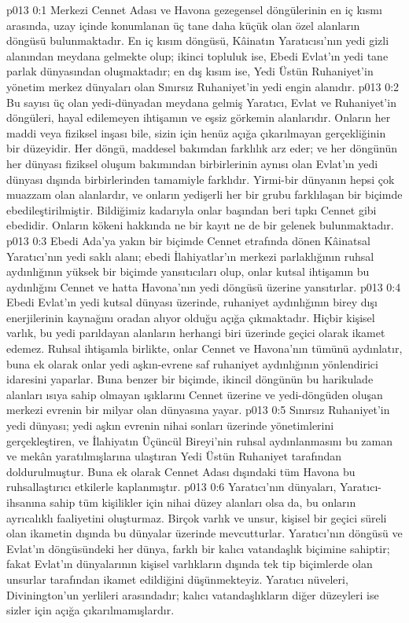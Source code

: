\vs p013 0:1 Merkezi Cennet Adası ve Havona gezegensel döngülerinin en iç kısmı arasında, uzay içinde konumlanan üç tane daha küçük olan özel alanların döngüsü bulunmaktadır. En iç kısım döngüsü, Kâinatın Yaratıcısı’nın yedi gizli alanından meydana gelmekte olup; ikinci topluluk ise, Ebedi Evlat’ın yedi tane parlak dünyasından oluşmaktadır; en dış kısım ise, Yedi Üstün Ruhaniyet’in yönetim merkez dünyaları olan Sınırsız Ruhaniyet’in yedi engin alanıdır.
\vs p013 0:2 Bu sayısı üç olan yedi\hyp{}dünyadan meydana gelmiş Yaratıcı, Evlat ve Ruhaniyet’in döngüleri, hayal edilemeyen ihtişamın ve eşsiz görkemin alanlarıdır. Onların her maddi veya fiziksel inşası bile, sizin için henüz açığa çıkarılmayan gerçekliğinin bir düzeyidir. Her döngü, maddesel bakımdan farklılık arz eder; ve her döngünün her dünyası fiziksel oluşum bakımından birbirlerinin aynısı olan Evlat’ın yedi dünyası dışında birbirlerinden tamamiyle farklıdır. Yirmi\hyp{}bir dünyanın hepsi çok muazzam olan alanlardır, ve onların yedişerli her bir grubu farklılaşan bir biçimde ebedileştirilmiştir. Bildiğimiz kadarıyla onlar başından beri tıpkı Cennet gibi ebedidir. Onların kökeni hakkında ne bir kayıt ne de bir gelenek bulunmaktadır.
\vs p013 0:3 Ebedi Ada’ya yakın bir biçimde Cennet etrafında dönen Kâinatsal Yaratıcı’nın yedi saklı alanı; ebedi İlahiyatlar’ın merkezi parlaklığının ruhsal aydınlığının yüksek bir biçimde yansıtıcıları olup, onlar kutsal ihtişamın bu aydınlığını Cennet ve hatta Havona’nın yedi döngüsü üzerine yansıtırlar.
\vs p013 0:4 Ebedi Evlat’ın yedi kutsal dünyası üzerinde, ruhaniyet aydınlığının birey dışı enerjilerinin kaynağını oradan alıyor olduğu açığa çıkmaktadır. Hiçbir kişisel varlık, bu yedi parıldayan alanların herhangi biri üzerinde geçici olarak ikamet edemez. Ruhsal ihtişamla birlikte, onlar Cennet ve Havona’nın tümünü aydınlatır, buna ek olarak onlar yedi aşkın\hyp{}evrene saf ruhaniyet aydınlığının yönlendirici idaresini yaparlar. Buna benzer bir biçimde, ikincil döngünün bu harikulade alanları ısıya sahip olmayan ışıklarını Cennet üzerine ve yedi\hyp{}döngüden oluşan merkezi evrenin bir milyar olan dünyasına yayar.
\vs p013 0:5 Sınırsız Ruhaniyet’in yedi dünyası; yedi aşkın evrenin nihai sonları üzerinde yönetimlerini gerçekleştiren, ve İlahiyatın Üçüncül Bireyi’nin ruhsal aydınlanmasını bu zaman ve mekân yaratılmışlarına ulaştıran Yedi Üstün Ruhaniyet tarafından doldurulmuştur. Buna ek olarak Cennet Adası dışındaki tüm Havona bu ruhsallaştırıcı etkilerle kaplanmıştır.
\vs p013 0:6 Yaratıcı’nın dünyaları, Yaratıcı\hyp{}ihsanına sahip tüm kişilikler için nihai düzey alanları olsa da, bu onların ayrıcalıklı faaliyetini oluşturmaz. Birçok varlık ve unsur, kişisel bir geçici süreli olan ikametin dışında bu dünyalar üzerinde mevcutturlar. Yaratıcı’nın döngüsü ve Evlat’ın döngüsündeki her dünya, farklı bir kalıcı vatandaşlık biçimine sahiptir; fakat Evlat’ın dünyalarının kişisel varlıkların dışında tek tip biçimlerde olan unsurlar tarafından ikamet edildiğini düşünmekteyiz. Yaratıcı nüveleri, Divinington’un yerlileri arasındadır; kalıcı vatandaşlıkların diğer düzeyleri ise sizler için açığa çıkarılmamışlardır.
